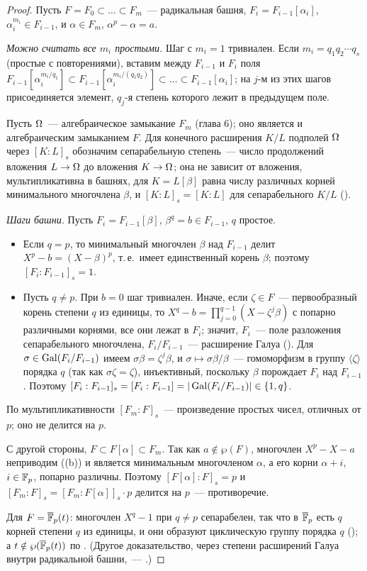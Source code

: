 \begin{proof}
Пусть $F=F_0\subset\dots\subset F_m$~--- радикальная башня, $F_i=F_{i-1}[\alpha_i]$, $\alpha_i^{m_i}\in F_{i-1}$, и
$\alpha\in F_m$, $\alpha^p-\alpha=a$.

\emph{Можно считать все $m_i$ простыми.} Шаг с $m_i=1$ тривиален. Если $m_i=q_1q_2\cdots q_s$ (простые с повторениями),
вставим между $F_{i-1}$ и $F_i$ поля $F_{i-1}[\alpha_i^{m_i/q_1}]\subset F_{i-1}[\alpha_i^{m_i/(q_1q_2)}]\subset\dots\subset F_{i-1}[\alpha_i]$;
на $j$-м из этих шагов присоединяется элемент, $q_j$-я степень которого лежит в предыдущем поле.

Пусть $\Omega$~--- алгебраическое замыкание $F_m$ (глава 6); оно является и алгебраическим замыканием $F$. Для конечного
расширения $K/L$ подполей $\Omega$ через $[K:L]_s$ обозначим сепарабельную степень~--- число продолжений вложения $L\to\Omega$
до вложения $K\to\Omega$; она не зависит от вложения, мультипликативна в башнях, для $K=L[\beta]$ равна числу различных
корней минимального многочлена $\beta$, и $[K:L]_s=[K:L]$ для сепарабельного $K/L$ ().

\emph{Шаги башни.} Пусть $F_i=F_{i-1}[\beta]$, $\beta^q=b\in F_{i-1}$, $q$ простое.
\begin{itemize}
\item Если $q=p$, то минимальный многочлен $\beta$ над $F_{i-1}$ делит $X^p-b=(X-\beta)^p$, т.\,е.\ имеет единственный корень
$\beta$; поэтому $[F_i:F_{i-1}]_s=1$.
\item Пусть $q\ne p$. При $b=0$ шаг тривиален. Иначе, если $\zeta\in F$~--- первообразный корень степени $q$ из единицы,
то $X^q-b=\prod_{j=0}^{q-1}(X-\zeta^j\beta)$ с попарно различными корнями, все они лежат в $F_i$; значит, $F_i$~--- поле
разложения сепарабельного многочлена, $F_i/F_{i-1}$~--- расширение Галуа (). Для
$\sigma\in\operatorname{Gal}(F_i/F_{i-1})$ имеем $\sigma\beta=\zeta^{j}\beta$, и $\sigma\mapsto\sigma\beta/\beta$~--- гомоморфизм в группу
$\langle\zeta\rangle$ порядка $q$ (так как $\sigma\zeta=\zeta$), инъективный, поскольку $\beta$ порождает $F_i$ над $F_{i-1}$.
Поэтому $[F_i:F_{i-1}]_s=[F_i:F_{i-1}]=|\operatorname{Gal}(F_i/F_{i-1})|\in\{1,q\}$.
\end{itemize}
По мультипликативности $[F_m:F]_s$~--- произведение простых чисел, отличных от $p$; оно не делится на $p$.

С другой стороны, $F\subset F[\alpha]\subset F_m$. Так как $a\notin\wp(F)$, многочлен $X^p-X-a$ неприводим ((b)) и
является минимальным многочленом $\alpha$, а его корни $\alpha+i$, $i\in\mathbb F_p$, попарно различны. Поэтому
$[F[\alpha]:F]_s=p$ и $[F_m:F]_s=[F_m:F[\alpha]]_s\cdot p$ делится на $p$~--- противоречие.

Для $F=\overline{\mathbb F}_p(t)$: многочлен $X^q-1$ при $q\ne p$ сепарабелен, так что в $\overline{\mathbb F}_p$ есть $q$ корней степени $q$ из единицы, и они
образуют циклическую группу порядка $q$ (); а $t\notin\wp(\overline{\mathbb F}_p(t))$ по . (Другое доказательство, через
степени расширений Галуа внутри радикальной башни,~--- .)
\end{proof}

